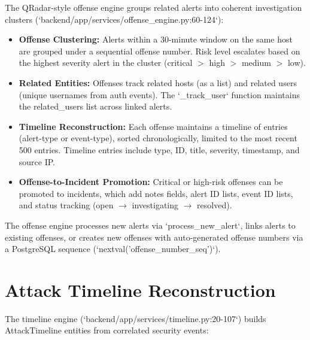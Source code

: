 The QRadar-style offense engine groups related alerts into coherent investigation clusters (`backend/app/services/offense_engine.py:60-124`):

\begin{itemize}
    \item \textbf{Offense Clustering:} Alerts within a 30-minute window on the same host are grouped under a sequential offense number. Risk level escalates based on the highest severity alert in the cluster (critical $>$ high $>$ medium $>$ low).
    \item \textbf{Related Entities:} Offenses track related hosts (as a list) and related users (unique usernames from auth events). The `_track_user` function maintains the related\_users list across linked alerts.
    \item \textbf{Timeline Reconstruction:} Each offense maintains a timeline of entries (alert-type or event-type), sorted chronologically, limited to the most recent 500 entries. Timeline entries include type, ID, title, severity, timestamp, and source IP.
    \item \textbf{Offense-to-Incident Promotion:} Critical or high-risk offenses can be promoted to incidents, which add notes fields, alert ID lists, event ID lists, and status tracking (open $\rightarrow$ investigating $\rightarrow$ resolved).
\end{itemize}

The offense engine processes new alerts via `process_new_alert`, links alerts to existing offenses, or creates new offenses with auto-generated offense numbers via a PostgreSQL sequence (`nextval('offense_number_seq')`).

\section{Attack Timeline Reconstruction}

The timeline engine (`backend/app/services/timeline.py:20-107`) builds AttackTimeline entities from correlated security events:

